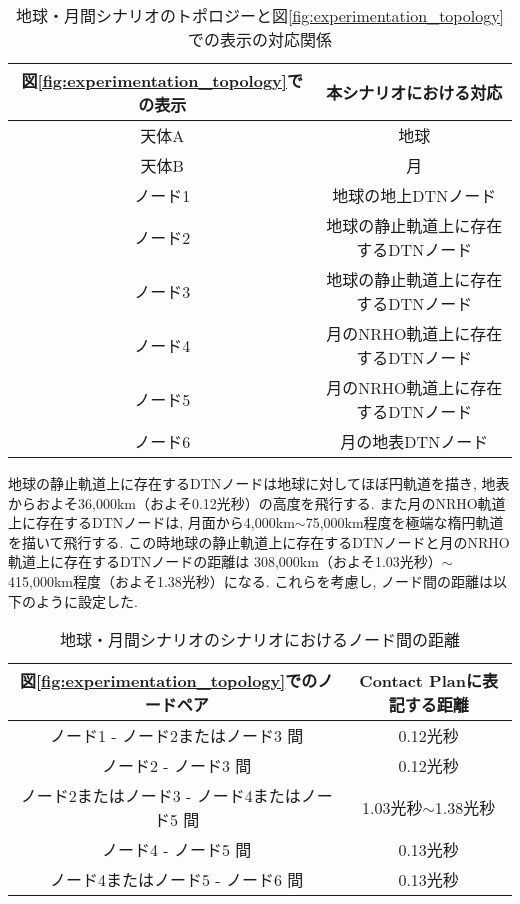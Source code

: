 \begin{table}[htbp]
    \centering
    \caption{地球・月間シナリオのトポロジーと図\ref{fig:experimentation_topology}での表示の対応関係}
    \vspace{3mm} 
    \begin{tabular}{cc}  \hline
        図\ref{fig:experimentation_topology}での表示 & 本シナリオにおける対応 \\ \hline
        天体A & 地球 \\
        天体B & 月 \\
        ノード1 & 地球の地上DTNノード \\
        ノード2 & 地球の静止軌道上に存在するDTNノード \\
        ノード3 & 地球の静止軌道上に存在するDTNノード \\
        ノード4 & 月のNRHO軌道上に存在するDTNノード \\
        ノード5 & 月のNRHO軌道上に存在するDTNノード \\
        ノード6 & 月の地表DTNノード \\ \hline
    \end{tabular}
    \label{table:earth_moon_scenario_topology}
\end{table}

地球の静止軌道上に存在するDTNノードは地球に対してほぼ円軌道を描き, 
地表からおよそ36,000km（およそ0.12光秒）の高度を飛行する. 
また月のNRHO軌道上に存在するDTNノードは,  月面から4,000km$\sim$75,000km程度を極端な楕円軌道を描いて飛行する. 
この時地球の静止軌道上に存在するDTNノードと月のNRHO軌道上に存在するDTNノードの距離は
308,000km（およそ1.03光秒）$\sim$415,000km程度（およそ1.38光秒）になる. 
これらを考慮し, ノード間の距離は以下のように設定した. 
\begin{table}[htbp]
    \centering
    \caption{地球・月間シナリオのシナリオにおけるノード間の距離}
    \vspace{3mm} 
    \begin{tabular}{cc}  \hline
        図\ref{fig:experimentation_topology}でのノードペア & Contact Planに表記する距離 \\ \hline
        ノード1 - ノード2またはノード3 間　& 0.12光秒 \\
        ノード2 - ノード3 間 & 0.12光秒 \\
        ノード2またはノード3 - ノード4またはノード5  間 & 1.03光秒$\sim$1.38光秒 \\
        ノード4 - ノード5  間 & 0.13光秒 \\
        ノード4またはノード5 - ノード6  間 & 0.13光秒 \\ \hline
    \end{tabular}
    \label{table:earth_moon_scenario_distance}
\end{table}


